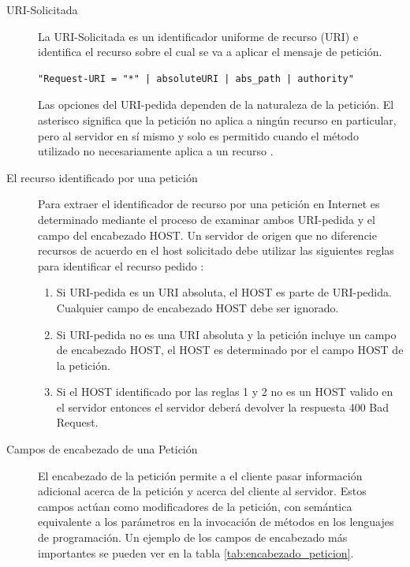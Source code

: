 \begin{description}
\item[URI-Solicitada]
La URI-Solicitada es un identificador uniforme de recurso (URI) e identifica el recurso sobre el cual se va a aplicar el mensaje de petición.

\begin{lstlisting}[caption={URI-Solicitada},label={lst:uri_solicitada}]
"Request-URI = "*" | absoluteURI | abs_path | authority"
\end{lstlisting}

Las opciones del URI-pedida dependen de la naturaleza de la petición. El asterisco significa que la petición no aplica a ningún recurso en particular, pero al servidor en sí mismo y solo es permitido cuando el método utilizado no necesariamente aplica a un recurso \cite{rfc2616}.

\item[El recurso identificado por una petición]

Para extraer el identificador de recurso por una petición en Internet es determinado mediante el proceso de examinar ambos URI-pedida y el campo del encabezado HOST.
Un servidor de origen que no diferencie recursos de acuerdo en el host solicitado debe utilizar las siguientes reglas para identificar el recurso pedido \cite{rfc2616}:
\begin{enumerate}
\item Si URI-pedida es un URI absoluta, el HOST es parte de URI-pedida. Cualquier campo de encabezado HOST debe ser ignorado.
\item Si URI-pedida no es una URI absoluta y la petición incluye un campo de encabezado HOST, el HOST es determinado por el campo HOST de la petición. 
\item Si el HOST identificado por las reglas 1 y 2 no es un HOST valido en el servidor entonces el servidor deberá devolver la respuesta 400 Bad Request.
\end{enumerate}

\item[Campos de encabezado de una Petición]

El encabezado de la petición permite a el cliente pasar información adicional acerca de la petición y acerca del cliente al servidor. Estos campos actúan como modificadores de la petición, con semántica equivalente a los parámetros en la invocación de métodos en los lenguajes de programación. Un ejemplo de los campos de encabezado más importantes se pueden ver en la tabla \ref{tab:encabezado_peticion}.


\end{description}
